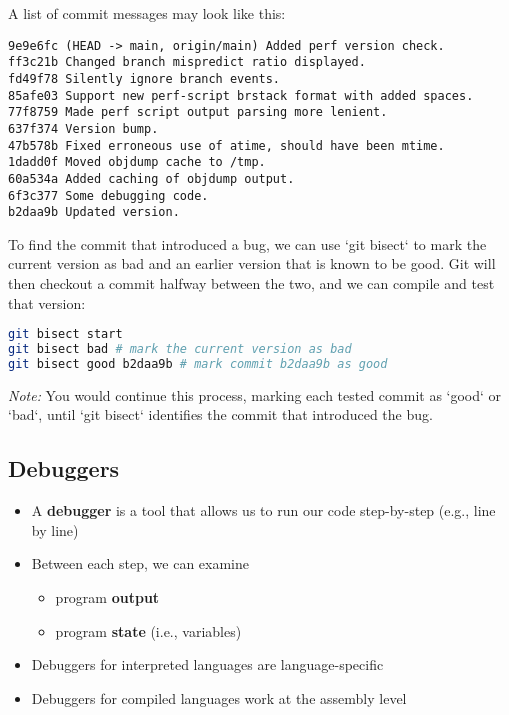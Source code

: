 \documentclass[12pt]{article}
\begin{document}
A list of commit messages may look like this:

\begin{lstlisting}
9e9e6fc (HEAD -> main, origin/main) Added perf version check.
ff3c21b Changed branch mispredict ratio displayed.
fd49f78 Silently ignore branch events.
85afe03 Support new perf-script brstack format with added spaces.
77f8759 Made perf script output parsing more lenient.
637f374 Version bump.
47b578b Fixed erroneous use of atime, should have been mtime.
1dadd0f Moved objdump cache to /tmp.
60a534a Added caching of objdump output.
6f3c377 Some debugging code.
b2daa9b Updated version.
\end{lstlisting}

To find the commit that introduced a bug, we can use `git bisect` to mark the current version as bad and an earlier version that is known to be good. Git will then checkout a commit halfway between the two, and we can compile and test that version:

\begin{lstlisting}[language=bash]
git bisect start
git bisect bad # mark the current version as bad
git bisect good b2daa9b # mark commit b2daa9b as good
\end{lstlisting}

\textit{Note:} You would continue this process, marking each tested commit as `good` or `bad`, until `git bisect` identifies the commit that introduced the bug.


\subsection{Debuggers}

\begin{itemize}
    \item A \textbf{debugger} is a tool that allows us to run our code step-by-step (e.g., line by line)
    \item Between each step, we can examine
    \begin{itemize}
        \item program \textbf{output}
        \item program \textbf{state} (i.e., variables)
    \end{itemize}
    \item Debuggers for interpreted languages are language-specific
    \item Debuggers for compiled languages work at the assembly level
\end{itemize}
\end{document}
